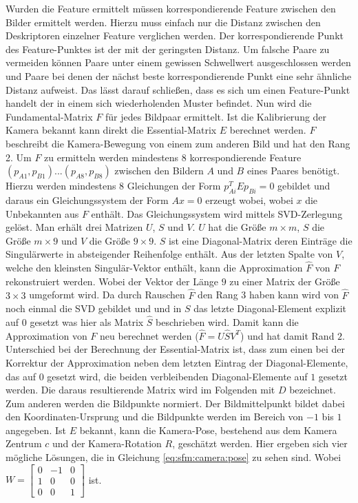 \documentclass[12pt,titlepage, twoside]{article}
\begin{document}
Wurden die Feature ermittelt müssen korrespondierende Feature zwischen den Bilder ermittelt werden. Hierzu muss einfach nur die Distanz zwischen den Deskriptoren einzelner Feature verglichen werden. 
Der korrespondierende Punkt des Feature-Punktes ist der mit der geringsten Distanz. Um falsche Paare zu vermeiden können Paare unter einem gewissen Schwellwert ausgeschlossen werden und 
Paare bei denen der nächst beste korrespondierende Punkt eine sehr ähnliche Distanz aufweist. Das lässt darauf schließen, dass es sich um einen Feature-Punkt handelt der in einem sich wiederholenden Muster befindet.
Nun wird die Fundamental-Matrix $F$ für jedes Bildpaar ermittelt. Ist die Kalibrierung der Kamera bekannt kann direkt die Essential-Matrix $E$ berechnet werden.
$F$ beschreibt die Kamera-Bewegung von einem zum anderen Bild und hat den Rang 2.
Um $F$ zu ermitteln werden mindestens 8 korrespondierende Feature $(p_{A1},p_{B1})...(p_{A8},p_{B8})$ zwischen den Bildern $A$ und $B$ eines Paares benötigt. 
Hierzu werden mindestens 8 Gleichungen der Form $p_{Ai}^TEp_{Bi}=0$ gebildet und daraus ein Gleichungssystem der Form $Ax=0$ erzeugt wobei, wobei $x$ die Unbekannten aus $F$ enthält.
Das Gleichungssystem wird mittels SVD-Zerlegung gelöst. Man erhält drei Matrizen $U$, $S$ und $V$. $U$ hat die Größe $m\times m$, $S$ die Größe $m\times 9$ und $V$ die Größe $9\times 9$.
$S$ ist eine Diagonal-Matrix deren Einträge die Singulärwerte in absteigender Reihenfolge enthält.
Aus der letzten Spalte von $V$, welche den kleinsten Singulär-Vektor enthält, kann die Approximation $\hat{F}$ von $F$ rekonstruiert werden. 
Wobei der Vektor der Länge $9$ zu einer Matrix der Größe $3\times3$ umgeformt wird.
Da durch Rauschen $\hat{F}$ den Rang 3 haben kann wird von $\hat{F}$ noch einmal die SVD gebildet und und in $S$ das letzte Diagonal-Element explizit auf $0$ gesetzt was hier als Matrix $\hat{S}$ beschrieben wird.
Damit kann die Approximation von $F$ neu berechnet werden ($\hat{F} = U\hat{S}V^T$) und hat damit Rand $2$.
Unterschied bei der Berechnung der Essential-Matrix ist, dass zum einen bei der Korrektur der Approximation neben dem letzten Eintrag der Diagonal-Elemente, das auf $0$ gesetzt wird, 
die beiden verbleibenden Diagonal-Elemente auf $1$ gesetzt werden. Die daraus resultierende Matrix wird im Folgenden mit $D$ bezeichnet. Zum anderen werden die Bildpunkte normiert.
Der Bildmittelpunkt bildet dabei den Koordinaten-Ursprung und die Bildpunkte werden im Bereich von $-1$ bis $1$ angegeben.
Ist $E$ bekannt, kann die Kamera-Pose, bestehend aus dem Kamera Zentrum $c$ und der Kamera-Rotation $R$, geschätzt werden.
Hier ergeben sich vier mögliche Lösungen, die in Gleichung \ref{eq:sfm:camera:pose} zu sehen sind. Wobei $W=
\begin{bmatrix}
    0 & -1 & 0\\
    1 & 0 & 0\\
    0 & 0 & 1
\end{bmatrix}
$ ist.
\end{document}
